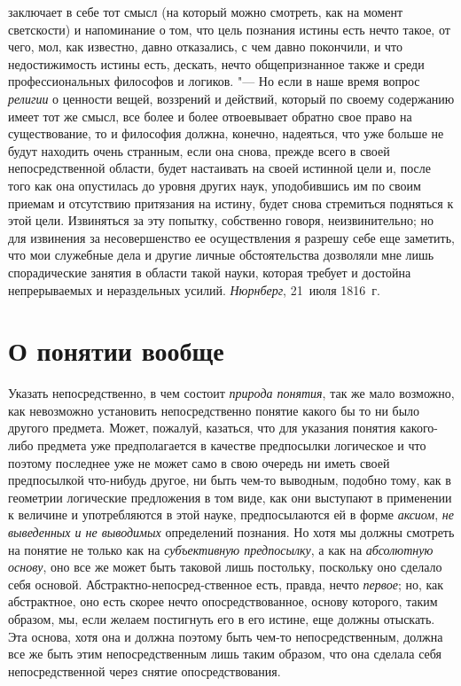 заключает в себе тот смысл (на который можно смотреть, как на момент
светскости) и напоминание о том, что цель познания истины есть нечто такое,
от чего, мол, как известно, давно отказались, с чем давно покончили, и
что недостижимость истины есть, дескать, нечто
общепризнанное также и среди профессиональных философов и логиков. "---
Но если в наше время вопрос {\em религии} о ценности
вещей, воззрений и действий, который по своему содержанию имеет тот же
смысл, все более и более отвоевывает обратно свое право на существование,
то и философия должна, конечно, надеяться, что уже больше не будут находить
очень странным, если она снова, прежде всего в своей непосредственной
области, будет настаивать на своей истинной цели и, после того как она
опустилась до уровня других наук, уподобившись им по своим приемам и
отсутствию притязания на истину, будет снова стремиться подняться к этой
цели. Извиняться за эту попытку, собственно говоря, неизвинительно; но для
извинения за несовершенство ее осуществления я разрешу себе еще заметить,
что мои служебные дела и другие личные обстоятельства дозволяли мне лишь
спорадические занятия в области такой науки, которая требует и достойна
непрерываемых и нераздельных усилий.
{\em Нюрнберг}, 21~июля 1816~г.

\clearpage\chapter[О понятии вообще]{О понятии вообще}
Указать непосредственно, в чем состоит {\em природа понятия},
так же мало возможно, как невозможно установить
непосредственно понятие какого бы то ни было другого предмета. Может,
пожалуй, казаться, что для указания понятия какого-либо предмета уже
предполагается в качестве предпосылки логическое и что поэтому последнее
уже не может само в свою очередь ни иметь своей предпосылкой что-нибудь
другое, ни быть чем-то выводным, подобно тому, как в геометрии логические
предложения в том виде, как они выступают в применении к величине и
употребляются в этой науке, предпосылаются ей в форме
{\em аксиом}, {\em не выведенных и не выводимых} определений познания.
Но хотя мы должны смотреть на понятие не только как на {\em субъективную
предпосылку}, а как на {\em абсолютную основу}, оно все же может быть
таковой лишь постольку, поскольку оно сделало себя основой.
Абстрактно-непосред-ственное есть, правда, нечто {\em первое}; но, как
абстрактное, оно есть скорее нечто опосредствованное, основу которого,
таким образом, мы, если желаем постигнуть его в его истине, еще должны
отыскать. Эта основа, хотя она и должна поэтому быть чем-то
непосредственным, должна все же быть этим непосредственным лишь таким
образом, что она сделала себя непосредственной через снятие
опосредствования.

